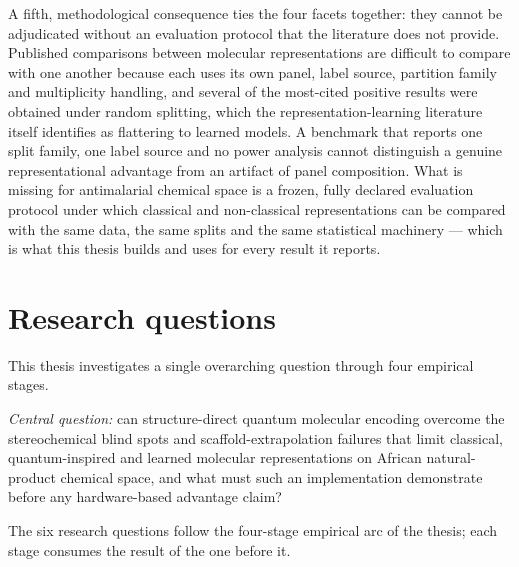 A fifth, methodological consequence ties the four facets together: they cannot be adjudicated without an evaluation protocol that the literature does not provide. Published comparisons between molecular representations are difficult to compare with one another because each uses its own panel, label source, partition family and multiplicity handling, and several of the most-cited positive results were obtained under random splitting, which the representation-learning literature itself identifies as flattering to learned models. A benchmark that reports one split family, one label source and no power analysis cannot distinguish a genuine representational advantage from an artifact of panel composition. What is missing for antimalarial chemical space is a frozen, fully declared evaluation protocol under which classical and non-classical representations can be compared with the same data, the same splits and the same statistical machinery --- which is what this thesis builds and uses for every result it reports.

\section*{Research questions}

This thesis investigates a single overarching question through four empirical stages.

\emph{Central question:} can structure-direct quantum molecular encoding overcome the stereochemical blind spots and scaffold-extrapolation failures that limit classical, quantum-inspired and learned molecular representations on African natural-product chemical space, and what must such an implementation demonstrate before any hardware-based advantage claim?

The six research questions follow the four-stage empirical arc of the thesis; each stage consumes the result of the one before it.

